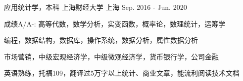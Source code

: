 

\begin{cventries}

  \cventry
    {应用统计学，本科} %
    {上海财经大学} %
    {上海} %
    {Sep. 2016 - Jun. 2020} %
    {
      \begin{cvitems} %
        \item {成绩A/A-:   高等代数，数学分析，实变函数，概率论，数理统计，运筹学}
        \item {编程，数据结构，数据库，操作系统，数据分析，属性数据分析}
        \item {市场营销，中级宏观经济学，中级微观经济学，货币银行学，公司金融}
        \item {英语熟练，托福109，翻译过5万字以上统计、商业文章，能流利阅读技术文档}
      \end{cvitems}
    }

\end{cventries}
